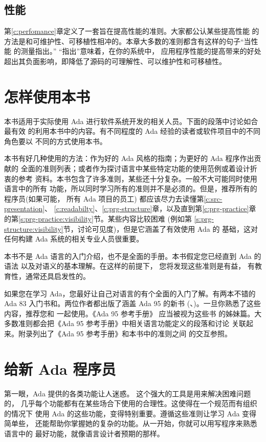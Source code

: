 \subsection{性能}
第\ref{c:perfomance}章定义了一套旨在提高性能的准则。大家都公认某些提高性能
的方法是和可维护性、可移植性相冲的。本章大多数的准则都含有这样的句子``当性能
的测量指出。'' ``指出''意味着，在你的系统中， 应用程序性能的提高带来的好处
超出其负面影响，即降低了源码的可理解性、可以维护性和可移植性。

\section{怎样使用本书}
本书适用于实际使用 Ada 进行软件系统开发的相关人员。下面的段落中讨论如合最有效
的利用本书中的内容。有不同程度的 Ada 经验的读者或软件项目中的不同角色要以
不同的方式使用本书。

本书有好几种使用的方法：作为好的 Ada 风格的指南；为更好的 Ada 程序作出贡献的
全面的准则列表；或者作为探讨语言中某些特定功能的使用范例或着设计折衷的参考
资料。本书包含了许多准则，某些还十分复杂。一般不大可能同时使用语言中的所有
功能，所以同时学习所有的准则并不是必须的。但是，推荐所有的程序员(如果可能，
所有 Ada 项目的员工) 都应该尽力去读懂第\ref{c:src-presentation}、
\ref{c:readabilty}、\ref{c:prg-structure}章，以及直到第\ref{c:prg-practice}章
的第\ref{s:prg-practice:visibility}节。某些内容比较困难 (例如第
\ref{s:prg-structure:visibility}节，讨论可见度)，但是它涵盖了有效使用 Ada 的
基础，这对任何构建 Ada 系统的相关专业人员很重要。

本书不是 Ada 语言的入门介绍，也不是全面的手册。本书假定您已经直到 Ada 的语法
以及对语义的基本理解。在这样的前提下， 您将发现这些准则是有益，
有教育性，通常还具启发性的。

如果您在学习 Ada，您最好让自己对语言的有个全面的入门了解。有两本不错的 Ada 83
入门书\cite{barnes89}和\cite{cohen86}。两位作者都出版了涵盖 Ada 95 的新书
(\cite{barnes96}、\cite{cohen96})。一旦你熟悉了这些内容，推荐您和
\cite{rational95}一起使用。《Ada 95 参考手册》\cite{arm95} 应当被视为这些书
的姊妹篇。大多数准则都会把《Ada 95 参考手册》中相关语言功能定义的段落和讨论
关联起来。附录\cite{a:cross-ref}列出了《Ada 95 参考手册》和本书中的准则之间
的交互参照。

\section{给新 Ada 程序员}
第一眼，Ada 提供的各类功能让人迷惑。 这个强大的工具是用来解决困难问题的，
几乎每个功能都有在某些场合下使用的合理性。这使得在一个规范而有组织的情况下
使用 Ada 的这些功能，变得特别重要。遵循这些准则让学习 Ada 变得简单些，
还能帮助你掌握她的复杂的功能。从一开始，你就可以用写程序来熟悉语言中的
最好功能，就像语言设计者预期的那样。

